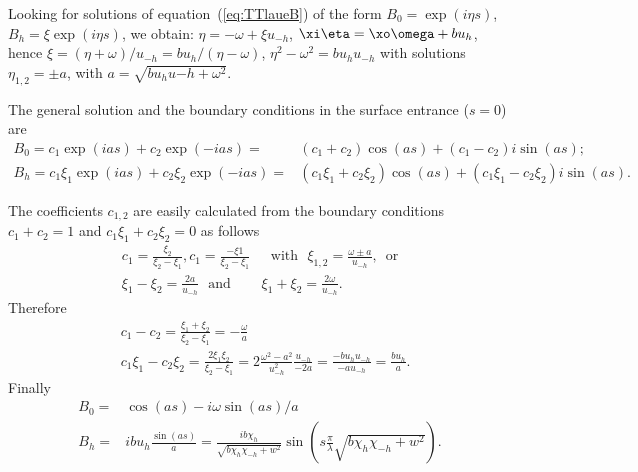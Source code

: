 \documentclass[preprint]{iucr}              %
\begin{document}
Looking for solutions of equation~(\ref{eq:TTlaueB}) of the form $B_0=\exp(i \eta s)$, $B_h=\xi \exp(i \eta s)$, we obtain: $\eta=-\omega+\xi u_{-h}$, $\xi \eta=\xo \omega+b u_h$, hence $\xi=(\eta+\omega)/u_{-h}=b u_h / (\eta-\omega)$, $\eta^2-\omega^2=b u_h u_{-h}$ with solutions $\eta_{1,2}=\pm a$, with $a=\sqrt{b u_h u{-h}+\omega^2}$.

The general solution and the boundary conditions in the surface entrance ($s=0$) are
\begin{subequations}
\label{eq:TTlaueSolutions}
\begin{align}
B_0 = c_1 \exp(i a s) + c_2 \exp(-i a s) =& (c_1+c_2) \cos(as) + (c_1-c_2) i \sin(as); \\
B_h = c_1 \xi_1 \exp(i a s) + c_2 \xi_2 \exp(-i a s) =& (c_1 \xi_1+c_2 \xi_2) \cos(as) + (c_1 \xi_1-c_2 \xi_2) i \sin(as).
\end{align}
\end{subequations}

The coefficients $c_{1,2}$ are easily calculated from the boundary conditions $c_1+c_2=1$ and $c_1\xi_1+c_2\xi_2=0$ as follows
\begin{subequations}
\label{eq:TTlaueCoefficients}
\begin{align}
c_1=\frac{\xi_2}{\xi_2-\xi_1}, c_1=\frac{-\xi1}{\xi_2-\xi_1}  & \text{~~with~~} \xi_{1,2} = \frac{\omega \pm a}{u_{-h}} \text{,~~or} \\
\xi_1-\xi_2 = \frac{2 a}{u_{-h}} \text{~~and~~} & \xi_1+\xi_2 = \frac{2 \omega}{u_{-h}} .
\end{align}
\end{subequations}
Therefore 
\begin{subequations}
\label{eq:TTlaueCoefficients2}
\begin{align}
&c_1-c_2=\frac{\xi_1+\xi_2}{\xi_2-\xi_1}=-\frac{\omega}{a}\\
&c_1\xi_1-c_2\xi_2=\frac{2\xi_1\xi_2}{\xi_2-\xi_1}=
2\frac{\omega^2-a^2}{u_{-h}^2}\frac{u_{-h}}{-2a}=\frac{-b u_h u_{-h}}{-a u_{-h}}=\frac{b u_h}{a}.
\end{align}
\end{subequations}
Finally
\begin{subequations}
\label{eq:laueSolutions}
\begin{align}
B_0 = & \cos(a s) - i \omega \sin(a s) / a \\
B_h = & i b u_h \frac{\sin(a s)}{a} = \frac{i b \chi_h}{\sqrt{b \chi_h \chi_{-h} + w^2}} \sin \left( s \frac{\pi}{\lambda} \sqrt{b \chi_h \chi_{-h} + w^2}\right).
\end{align}
\end{subequations}
\end{document}
